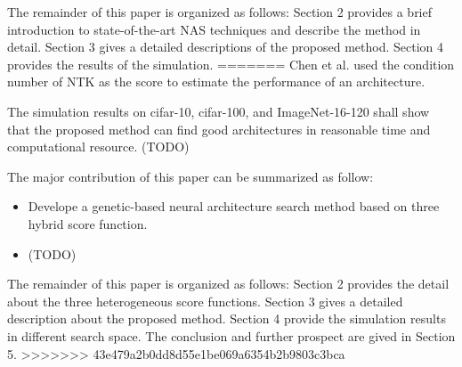 \documentclass[conference]{IEEEtran}
\begin{document}
    The remainder of this paper is organized as follows: Section 2 provides a 
    brief introduction to state-of-the-art NAS techniques and describe the 
    method in detail. Section 3 gives a detailed descriptions of the proposed 
    method. Section 4 provides the results of the simulation.
=======
    Chen et al. used the condition number of NTK as the score to estimate the performance of an architecture.

    The simulation results on cifar-10, cifar-100, and ImageNet-16-120 
    shall show that the proposed method can find good architectures in 
    reasonable time and computational resource. (TODO)

    The major contribution of this paper can be summarized as follow:
    \begin{itemize}
        \item Develope a genetic-based neural architecture search method based on three hybrid score function.
        \item (TODO)
    \end{itemize}

    The remainder of this paper is organized as follows: Section 2 provides the 
    detail about the three heterogeneous score functions. Section 3 gives a detailed 
    description about the proposed method. Section 4 provide the simulation results 
    in different search space. The conclusion and further prospect are gived in Section 5.
>>>>>>> 43e479a2b0dd8d55e1be069a6354b2b9803c3bca

    
    
\end{document}
